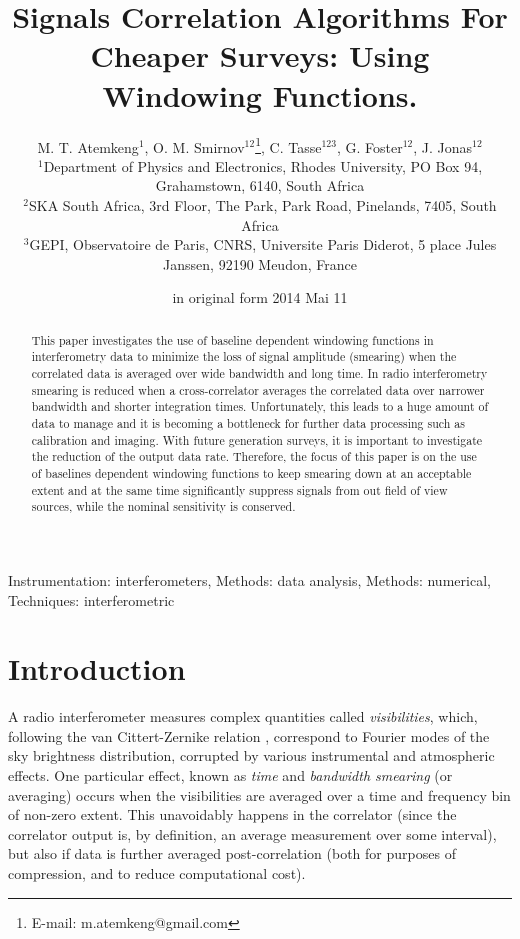 \documentclass[useAMS,usenatbib]{mn2e}
\title[Correlator Windowing Functions For Cheaper Surveys]{Signals Correlation Algorithms For Cheaper Surveys: Using Windowing Functions. 
}
\author[M. T. Atemkeng , O. M. Smirnov, C. Tasse, G. Foster and J. Jonas]{M. T. Atemkeng$^{1}$, O. M. Smirnov$^{12}$\thanks{E-mail: m.atemkeng@gmail.com}, 
 C. Tasse$^{123}$, G. Foster$^{12}$, J. Jonas$^{12}$ \\
$^1$Department of Physics and Electronics, Rhodes University, PO Box 94, Grahamstown, 6140, South Africa\\
$^2$SKA South Africa, 3rd Floor, The Park, Park Road, Pinelands, 7405, South Africa\\
$^3$GEPI, Observatoire de Paris, CNRS, Universite Paris Diderot, 5 place Jules Janssen, 92190 Meudon, France}
\begin{document}
\date{in original form 2014 Mai 11}

\pagerange{\pageref{firstpage}--\pageref{lastpage}} 

\maketitle

\label{firstpage}

\begin{abstract}
This paper investigates the use of baseline dependent windowing functions in interferometry data to minimize the loss of 
signal amplitude (smearing) when the correlated data is averaged over wide bandwidth and long time. In radio interferometry smearing is 
reduced when a cross-correlator averages the correlated data over narrower bandwidth and shorter integration times. Unfortunately, this 
leads to a huge amount of data to manage and it is becoming a bottleneck for further data processing such as calibration and 
imaging.  With future generation surveys, it is important to investigate the reduction of the output data rate. Therefore, the focus of 
this paper is on the use of baselines dependent windowing functions to keep smearing down at an acceptable extent and at the same time 
significantly suppress signals 
from out field of view sources, while the nominal sensitivity is conserved. 
\end{abstract}
\begin{keywords}
Instrumentation: interferometers, Methods: data analysis, Methods: numerical, Techniques: interferometric
\end{keywords}

\section[]{Introduction}

A radio interferometer measures complex quantities called \emph{visibilities}, which, following the van Cittert-Zernike 
relation \citep{tms}, correspond to Fourier modes of the sky brightness distribution, corrupted by various instrumental 
and atmospheric effects. One particular effect, known as \emph{time} and \emph{bandwidth smearing} (or averaging) occurs 
when the visibilities are averaged over a time and frequency bin of non-zero extent. This unavoidably happens in the correlator 
(since the correlator output is, by definition, an average measurement over some interval), but also if data is further 
averaged post-correlation (both for purposes of compression, and to reduce computational cost).
\end{document}

